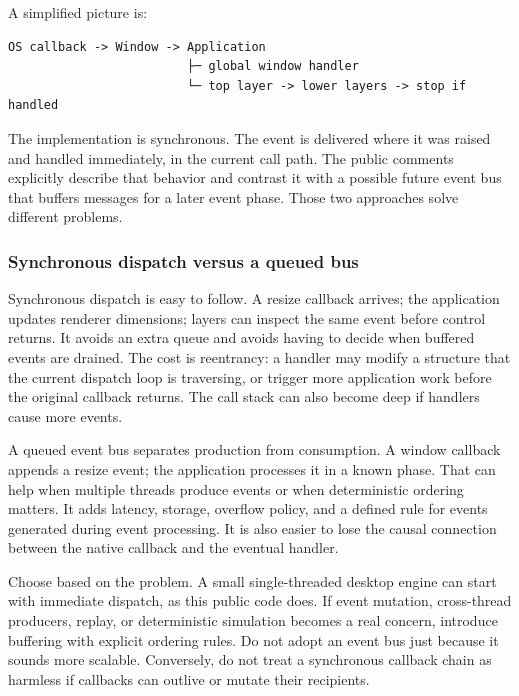 A simplified picture is:

\begin{verbatim}
OS callback -> Window -> Application
                         ├─ global window handler
                         └─ top layer -> lower layers -> stop if handled
\end{verbatim}

The implementation is synchronous. The event is delivered where it was raised and handled immediately, in the current call path. The public  comments explicitly describe that behavior and contrast it with a possible future event bus that buffers messages for a later event phase. Those two approaches solve different problems.

\subsubsection{Synchronous dispatch versus a queued bus}\label{05-engine-i-ch013-synchronous-dispatch-versus-a-queued-bus}

\hypertarget{05-engine-i-ch013-synchronous-dispatch-versus-a-queued-bus}{}

Synchronous dispatch is easy to follow. A resize callback arrives; the application updates renderer dimensions; layers can inspect the same event before control returns. It avoids an extra queue and avoids having to decide when buffered events are drained. The cost is reentrancy: a handler may modify a structure that the current dispatch loop is traversing, or trigger more application work before the original callback returns. The call stack can also become deep if handlers cause more events.

A queued event bus separates production from consumption. A window callback appends a resize event; the application processes it in a known phase. That can help when multiple threads produce events or when deterministic ordering matters. It adds latency, storage, overflow policy, and a defined rule for events generated during event processing. It is also easier to lose the causal connection between the native callback and the eventual handler.

Choose based on the problem. A small single-threaded desktop engine can start with immediate dispatch, as this public code does. If event mutation, cross-thread producers, replay, or deterministic simulation becomes a real concern, introduce buffering with explicit ordering rules. Do not adopt an event bus just because it sounds more scalable. Conversely, do not treat a synchronous callback chain as harmless if callbacks can outlive or mutate their recipients.


